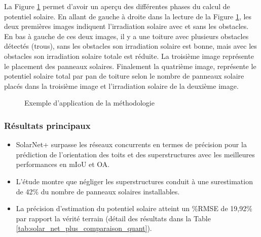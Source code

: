 \par{La Figure \ref{fig:solar_net_plus_exemple_methodo} permet d'avoir un aperçu des différentes phases du calcul de potentiel solaire. En allant de gauche à droite dans la lecture de la Figure \ref{fig:solar_net_plus_exemple_methodo}, les deux premières images indiquent l'irradiation solaire avec et sans les obstacles. En bas à gauche de ces deux images, il y a une toiture avec plusieurs obstacles détectés (trous), sans les obstacles son irradiation solaire est bonne, mais avec les obstacles son irradiation solaire totale est réduite. La troisième image représente le placement des panneaux solaires. Finalement la quatrième image, représente le potentiel solaire total par pan de toiture selon le nombre de panneaux solaire placés dans la troisième image et l'irradiation solaire de la deuxième image.}

\begin{figure}[H]
    \caption{Exemple d'application de la méthodologie \cite{li_deep_2024}}
    \label{fig:solar_net_plus_exemple_methodo}
\end{figure}

\subsubsection{Résultats principaux}
\begin{itemize}
    \item SolarNet+ surpasse les réseaux concurrents en termes de précision pour la prédiction de l'orientation des toits et des superstructures avec les meilleures performances en mIoU et OA.
    \item L'étude montre que négliger les superstructures conduit à une surestimation de 42\% du nombre de panneaux solaires installables.
    \item La précision d'estimation du potentiel solaire atteint un \%RMSE de 19,92\% par rapport la vérité terrain (détail des résultats dans la Table \ref{tab:solar_net_plus_comparaison_quant}).
\end{itemize}


